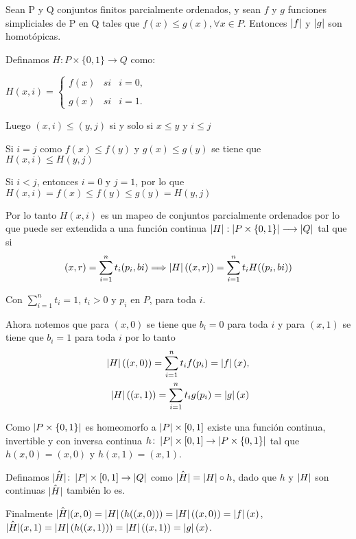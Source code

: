 \begin{Teo}
Sean P y Q conjuntos finitos parcialmente ordenados, y sean $f$ y $g$ funciones simpliciales de P en Q tales que $f(x)\leq g(x), \forall x\in P$. Entonces $\left| f \right|$ y $\left| g \right|$ son homotópicas.
\end{Teo}
\begin{Dem}

Definamos $H\colon P\times \{ 0,1\} \rightarrow Q$ como:

$H(x,i)= \left\{ \begin{array}{lcc}
              f(x)&   si &i=0,  \\
             \\ g(x) &  si& i=1. 
             \end{array}
    \right. $

Luego $(x,i) \leq (y,j)$ si y solo si $x\leq y$ y $i\leq j$

Si $i=j$ como $f(x)\leq f(y)$ y $g(x)\leq g(y)$ se tiene que $H(x,i)\leq H(y,j)$

Si $i<j$, entonces $i = 0$ y $j = 1$, por lo que
$H(x,i) = f(x)\leq f(y)\leq g(y) = H(y,j)$

Por lo tanto $H(x,i)$ es un mapeo de conjuntos parcialmente ordenados por lo que puede ser extendida a una función continua $\left| H \right|:\left| P\times \{ 0,1\} \right| \longrightarrow \left| Q \right|$ tal que si
\[
(x,r) =\sum_{i=1}^{n}t_{i}(p_{i},b{i}) \Longrightarrow \left| H \right|((x,r))= \sum_{i=1}^{n}t_{i}H((p_{i},b{i}))
\]

Con $\sum_{i=1}^{n}t_{i}=1$, $t_{i}>0$ y $p_{i}$ en $P$, para toda $i$.

Ahora notemos que para $(x,0)$ se tiene que  $b_{i}=0$ para toda $i$ y para $(x,1)$ se tiene que $ b_{i} = 1$ para toda $i$ por lo tanto
\begin{eqnarray}
\left| H \right|((x,0)) =\sum_{i=1}^{n}t_{i}f(p_{i}) = \left| f \right|(x),\\
\left| H \right|((x,1)) =\sum_{i=1}^{n}t_{i}g(p_{i}) = \left| g \right|(x)
\end{eqnarray}

Como $\left| P\times\{0,1\} \right|$ es homeomorfo a $\left| P \right|\times[0,1]$ existe una función continua, invertible y con inversa continua $h\colon\left| P \right|\times[0,1]\rightarrow \left| P\times\{0,1\} \right|$ tal que $h(x,0) = (x,0)$ y $h(x,1) = (x,1)$.

Definamos $\hat{\left| H \right|}\colon\left| P \right|\times[0,1]\to \left| Q \right|$ como $\hat{\left| H \right|} =  \left| H \right| \circ h$, dado que $h$ y $\left| H \right|$ son continuas $\hat{\left| H \right|}$ también lo es.

Finalmente 
$\hat{\left| H \right|}(x,0)= \left| H \right|(h((x,0)))=\left| H \right|((x,0)) = \left| f \right|(x)$,
$\hat{\left| H \right|}(x,1)= \left| H \right|(h((x,1)))=\left| H \right|((x,1)) = \left| g \right|(x)$.
\end{Dem}

